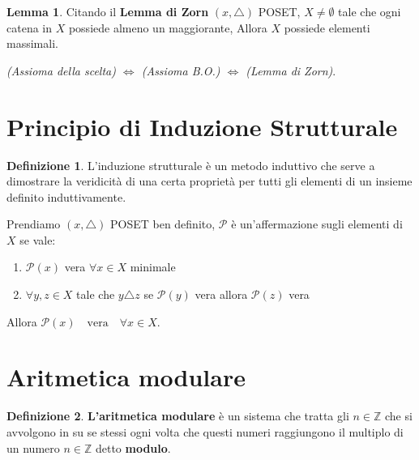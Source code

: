 \documentclass{article}
\theoremstyle{definition}
\newtheorem{definition}{Definizione}[section]
\newtheorem{lemma}{Lemma}[section]
\begin{document}
\begin{tcolorbox}
\begin{lemma}
Citando il \textbf{Lemma di Zorn} $(x, \triangle)$ POSET, $X \not = \emptyset$ tale che ogni catena in $X$ possiede almeno un maggiorante, Allora $X$ possiede elementi massimali. \par
\textit{(Assioma della scelta) $\Leftrightarrow$ (Assioma B.O.)  $\Leftrightarrow$ (Lemma di Zorn)}. \par
\end{lemma}
\end{tcolorbox}




\newpage
\section{Principio di Induzione Strutturale}\label{sec:principio_di_induzione_strutturale}
\begin{definition}
L'induzione strutturale è un metodo induttivo che serve a dimostrare la veridicità di una certa proprietà per tutti gli elementi di un insieme definito induttivamente.
\end{definition}

Prendiamo $(x,\triangle)$ POSET ben definito, $\mathcal{P}$ è un'affermazione sugli elementi di $X$ se vale:
\begin{enumerate}
        \item $\mathcal{P}(x)$ vera $\forall x \in X$ minimale
        \item $\forall y,z \in X $ tale che $y \triangle z$ se $\mathcal{P}(y)$ vera allora $\mathcal{P}(z)$ vera 
\end{enumerate}
Allora $\boxed{\mathcal{P}(x) \quad \mbox{vera} \quad  \forall x \in X}$.




\newpage
\section{Aritmetica modulare}\label{sec:aritmetica_modulare}
\begin{definition}
        \textbf{L'aritmetica modulare} è un sistema che tratta gli $ n \in \mathbb{Z} $ che si avvolgono in su se stessi ogni volta che questi numeri raggiungono il multiplo di un numero $ n\in \mathbb{Z}$ detto \textbf{modulo}.    
\end{definition}
\end{document}

